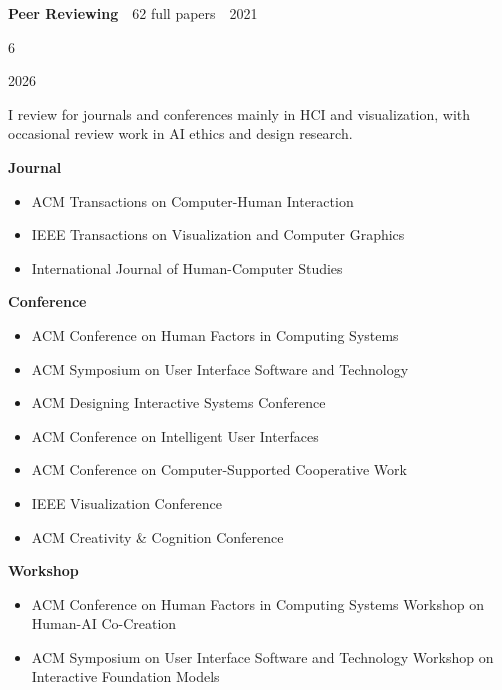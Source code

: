 \textcolor{basecolor}{\textbf{Peer Reviewing}\ \ }\textcolor{lighttext}{62 full papers\ \ {\scriptsize 2021}}
\begin{sparkline}{6}
\setlength\sparkbottomlinethickness{0.1pt} 
     \sparkbottomline[1] 
\end{sparkline}
\textcolor{lighttext}{{\scriptsize 2026}} 

I review for journals and conferences mainly in HCI and visualization, with occasional review work in AI ethics and design research.

\textbf{Journal}
\begin{itemize}[leftmargin=1.4em]
  \item ACM Transactions on Computer-Human Interaction
  \item IEEE Transactions on Visualization and Computer Graphics
  \item International Journal of Human-Computer Studies
\end{itemize}

\textbf{Conference}
\begin{itemize}[leftmargin=1.4em]
  \item ACM Conference on Human Factors in Computing Systems 
  \item ACM Symposium on User Interface Software and Technology 
  \item ACM Designing Interactive Systems Conference 
  \item ACM Conference on Intelligent User Interfaces 
  \item ACM Conference on Computer-Supported Cooperative Work 
  \item IEEE Visualization Conference 
  \item ACM Creativity \& Cognition Conference 
\end{itemize}

\textbf{Workshop}
\begin{itemize}[leftmargin=1.4em]
  \item ACM Conference on Human Factors in Computing Systems Workshop on Human-AI Co-Creation 
  \item ACM Symposium on User Interface Software and Technology Workshop on Interactive Foundation Models 
\end{itemize}


